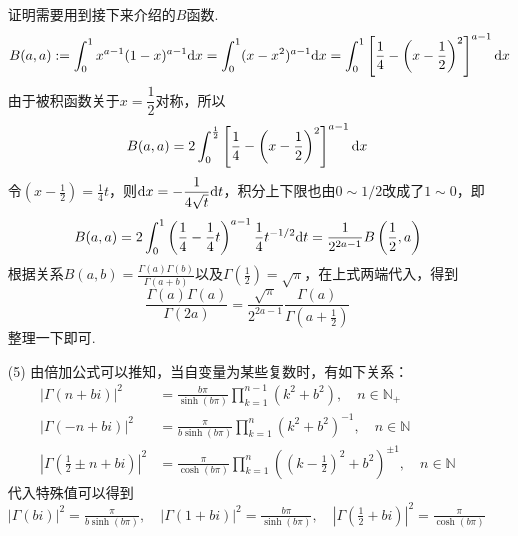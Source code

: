 \documentclass[main.tex]{subfiles}
\begin{document}
\begin{itemize}
{        证明需要用到接下来介绍的\(B\)函数.
        \[B(a,a) := \int_{0}^{1}x^{a-1}(1-x)^{a-1} {\rm d}x = \int_0^1 (x-x^2)^{a-1} {\rm d}x = \int_0^1 \left[\frac{1}{4} - \left(x-\frac{1}{2}\right)^2\right]^{a-1}{\rm d}x \]
        由于被积函数关于\(x=\dfrac{1}{2}\)对称，所以
        \[B(a,a)=2\int_0^{\frac{1}{2}} \left[\frac{1}{4} - \left(x-\frac{1}{2}\right)^2\right]^{a-1}{\rm d}x\]
        令\(\displaystyle{\left(x-\frac{1}{2}\right) = \frac{1}{4}t}\)，则\(\displaystyle{{\rm d}x = -\frac{1}{4\sqrt{t}}{\rm d}t}\)，积分上下限也由\(0\sim 1/2\)改成了\(1 \sim 0\)，即
        \[B(a,a) = 2\int_0^1 \left(\frac{1}{4}-\frac{1}{4}t\right)^{a-1}\frac{1}{4}t^{-1/2}{\rm d}t = \frac{1}{2^{2a-1}}B\left(\frac{1}{2},a\right)\]
        根据关系\(\displaystyle{B(a,b) = \frac{\Gamma(a)\Gamma(b)}{\Gamma(a+b)}}\)以及\(\displaystyle{\Gamma\left(\frac{1}{2}\right) = \sqrt{\pi}}\)，在上式两端代入，得到
        \[\frac{\Gamma(a)\Gamma(a)}{\Gamma(2a)} = \frac{\sqrt{\pi}}{2^{2a-1}}\frac{\Gamma(a)}{\Gamma\left(a+\frac{1}{2}\right)}\]
        整理一下即可.
    }
    \item[(5)] 由倍加公式可以推知，当自变量为某些复数时，有如下关系：
    \begin{align*}
        |\Gamma(n+bi)|^2 &= \frac{b\pi}{\sinh(b\pi)}\prod_{k=1}^{n-1} (k^2+b^2), \quad n \in \mathbb{N}_+ \\
        |\Gamma(-n+bi)|^2 &= \frac{\pi}{b\sinh(b\pi)}\prod_{k=1}^{n} (k^2+b^2)^{-1}, \quad n \in \mathbb{N} \\
        |\Gamma(\frac{1}{2} \pm n + bi)|^2 &= \frac{\pi}{\cosh(b\pi)}\prod_{k=1}^n \left((k-\frac{1}{2})^2+b^2\right)^{\pm 1}, \quad n \in \mathbb{N}
    \end{align*}
    代入特殊值可以得到\(\displaystyle{|\Gamma(bi)|^2 = \frac{\pi}{b \sinh (b\pi)}, \quad |\Gamma(1+bi)|^2 = \frac{b\pi}{\sinh(b\pi)}, \quad |\Gamma(\frac{1}{2}+bi)|^2 = \frac{\pi}{\cosh(b\pi)}}\)
\end{itemize}

\vspace{1cm}

\end{document}
